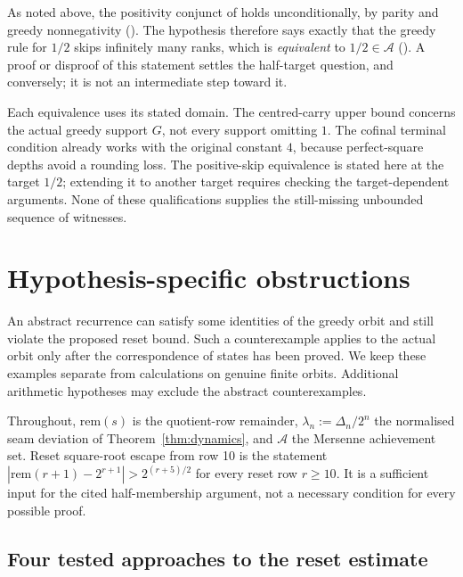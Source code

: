\begin{rem}
As noted above, the positivity conjunct of
 holds
unconditionally, by parity and greedy nonnegativity
().  The hypothesis therefore says
exactly that the greedy rule for $1/2$ skips infinitely many ranks, which is
\emph{equivalent} to $1/2\in\ensuremath{\mathcal A}$
().  A proof or disproof of this statement settles
the half-target question, and conversely; it is not an intermediate step toward it.
\end{rem}

\begin{rem}
Each equivalence uses its stated domain.  The centred-carry upper
bound concerns the actual greedy support $G$, not every support omitting
$1$.  The cofinal terminal condition already works with the original
constant $4$, because perfect-square depths avoid a rounding loss.
The positive-skip equivalence is stated here at the target $1/2$;
extending it to another target requires checking the target-dependent
arguments.  None of these qualifications supplies the still-missing
unbounded sequence of witnesses.
\end{rem}
\section{Hypothesis-specific obstructions}
An abstract recurrence can satisfy some identities of the greedy orbit
and still violate the proposed reset bound. Such a counterexample applies
to the actual orbit only after the correspondence of states has been
proved. We keep these examples separate from calculations on genuine
finite orbits. Additional arithmetic hypotheses may exclude the abstract
counterexamples.

Throughout, $\mathrm{rem}(s)$ is the quotient-row remainder, $\lambda_n := \Delta_n/2^n$ the normalised seam
deviation of Theorem~\ref{thm:dynamics}, and $\mathcal A$ the Mersenne achievement set. Reset square-root escape
from row 10 is the statement $|\mathrm{rem}(r+1)-2^{r+1}| > 2^{(r+5)/2}$ for every reset row $r\ge 10$.
It is a sufficient input for the cited
half-membership argument, not a necessary condition for every
possible proof.

\subsection{Four tested approaches to the reset estimate}

